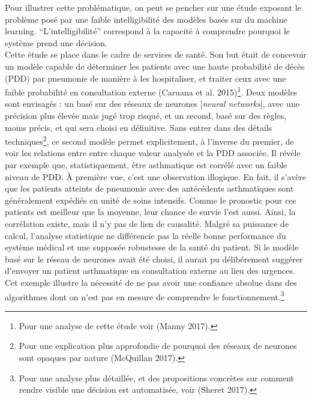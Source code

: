 \documentclass[]{article}
\begin{document}
Pour illustrer cette problématique, on peut se pencher sur une étude
exposant le problème posé par une faible intelligibilité des modèles
basés sur du machine learning. ``L'intelligibilité'' correspond à la
capacité à comprendre pourquoi le système prend une décision.\\
Cette étude se place dans le cadre de services de santé. Son but était
de concevoir un modèle capable de déterminer les patients avec une haute
probabilité de décès (PDD) par pneumonie de manière à les hospitaliser,
et traiter ceux avec une faible probabilité en consultation externe
(Caruana et al. 2015)\footnote{Pour une analyse de cette étude voir
  (Manny 2017).}. Deux modèles sont envisagés : un basé sur des réseaux
de neurones {[}\emph{neural networks}{]}, avec une précision plus élevée
mais jugé trop risqué, et un second, basé sur des règles, moins précis,
et qui sera choisi en définitive. Sans entrer dans des détails
techniques\footnote{Pour une explication plus approfondie de pourquoi
  des réseaux de neurones sont opaques par nature (McQuillan 2017).}, ce
second modèle permet explicitement, à l'inverse du premier, de voir les
relations entre entre chaque valeur analysée et la PDD associée. Il
révèle par exemple que, statistiquement, être asthmatique est corrélé
avec un faible niveau de PDD. À première vue, c'est une observation
illogique. En fait, il s'avère que les patients atteints de pneumonie
avec des antécédents asthmatiques sont généralement expédiés en unité de
soins intensifs. Comme le pronostic pour ces patients est meilleur que
la moyenne, leur chance de survie l'est aussi. Ainsi, la corrélation
existe, mais il n'y pas de lien de causalité. Malgré sa puissance de
calcul, l'analyse statistique ne différencie pas la réelle bonne
performance du système médical et une supposée robustesse de la santé du
patient. Si le modèle basé sur le réseau de neurones avait été choisi,
il aurait pu délibérement suggérer d'envoyer un patient asthmatique en
consultation externe au lieu des urgences. Cet exemple illustre la
nécessité de ne pas avoir une confiance absolue dans des algorithmes
dont on n'est pas en mesure de comprendre le fonctionnement.\footnote{Pour
  une analyse plus détaillée, et des propositions concrètes sur comment
  rendre visible une décision est automatisée, voir (Sheret 2017).}
\end{document}
